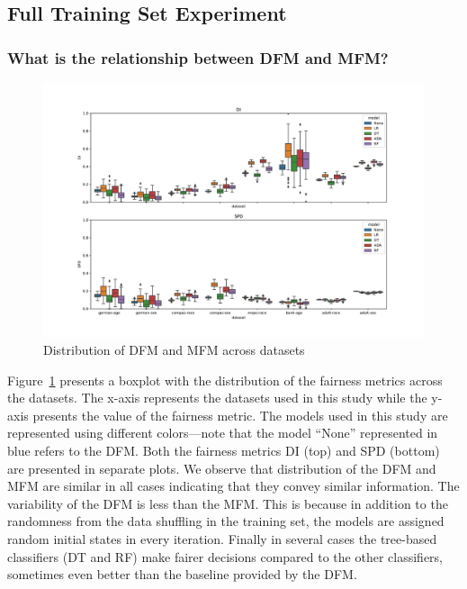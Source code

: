 \documentclass{article}
\begin{document}
\subsection{Full Training Set Experiment}\label{sec:results-full}
\subsubsection{What is the relationship between DFM and MFM?}\label{sec:results-full-rel}

\begin{figure}
  \centering
  \includegraphics[width=0.95\linewidth]{boxplot--dataset--di-spd--exp-full.pdf}
  \caption{Distribution of DFM and MFM across datasets}
  \label{fig:boxplot--dataset--di-spd--exp-full}
\end{figure}

Figure \ref{fig:boxplot--dataset--di-spd--exp-full} presents a boxplot
with the distribution of the fairness metrics across the datasets. The
x-axis represents the datasets used in this study while the y-axis
presents the value of the fairness metric. The models used in this
study are represented using different colors---note that the model
``None'' represented in blue refers to the DFM. Both the fairness
metrics DI (top) and SPD (bottom) are presented in separate plots. We
observe that distribution of the DFM and MFM are similar in all cases
indicating that they convey similar information. The variability of
the DFM is less than the MFM. This is because in addition to the
randomness from the data shuffling in the training set, the models are
assigned random initial states in every iteration. Finally in several
cases the tree-based classifiers (DT and RF) make fairer decisions
compared to the other classifiers, sometimes even better than the
baseline provided by the DFM.
\end{document}
